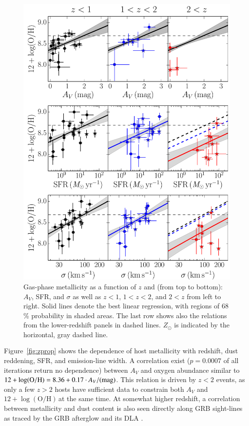 \documentclass[traditabstract, longauth]{aa}
\newcommand{\oh}{12+\log(\mathrm{O/H})}
\begin{document}
\begin{figure}
\includegraphics[angle=0, width=0.99\columnwidth]{Figs/Z_z_z.pdf}
\caption{Gas-phase metallicity as a function of $z$ and (from top to bottom): $A_V$, SFR, and $\sigma$ as well as $z < 1$, $1<z<2$, and $2<z$ from left to right. Solid lines denote the best linear regression, with regions of 68\,\% probability in shaded areas. The last row shows also the relations from the lower-redshift panels in dashed lines. $Z_{\odot}$ is indicated by the horizontal, gray dashed line.}
\label{fig:zpropz}
\end{figure}

Figure~\ref{fig:zprop} shows the dependence of host metallicity with redshift, dust reddening, SFR, and emission-line width. A correlation exist ($p=0.0007$ of all iterations return no dependence) between $A_V$ and oxygen abundance similar to $\oh = 8.36 + 0.17 \cdot A_V/(\rm{mag})$. This relation is driven by $z<2$ events, as only a few $z>2$ hosts have sufficient data to constrain both $A_V$ and $\oh$\,at the same time. At somewhat higher redshift, a correlation between metallicity and dust content is also seen directly along GRB sight-lines as traced by the GRB afterglow and its DLA \citep[][]{2013A&A...560A..26Z}. 
\end{document}
